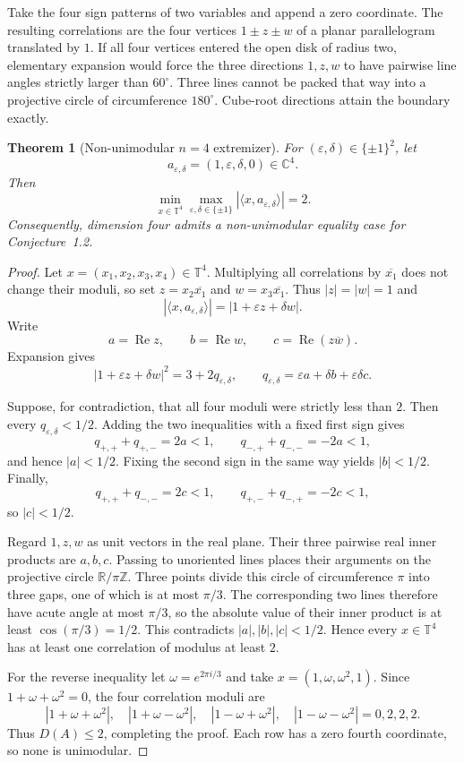 \documentclass[11pt]{article}
\newtheorem{theorem}{Theorem}
\newcommand{\T}{\mathbb T}
\begin{document}
Take the four sign patterns of two variables and append a zero coordinate.
The resulting correlations are the four vertices $1\pm z\pm w$ of a planar
parallelogram translated by $1$.  If all four vertices entered the open disk of
radius two, elementary expansion would force the three directions
$1,z,w$ to have pairwise line angles strictly larger than $60^\circ$.  Three
lines cannot be packed that way into a projective circle of circumference
$180^\circ$.  Cube-root directions attain the boundary exactly.

\begin{theorem}[Non-unimodular $n=4$ extremizer]
For $(\varepsilon,\delta)\in\{\pm1\}^2$, let
\[
 a_{\varepsilon,\delta}=(1,\varepsilon,\delta,0)\in\mathbb C^4.
\]
Then
\[
 \min_{x\in\T^4}\max_{\varepsilon,\delta\in\{\pm1\}}
 |\langle x,a_{\varepsilon,\delta}\rangle|=2.
\]
Consequently, dimension four admits a non-unimodular equality case for
Conjecture~1.2.
\end{theorem}

\begin{proof}
Let $x=(x_1,x_2,x_3,x_4)\in\T^4$.  Multiplying all correlations by
$\overline{x_1}$ does not change their moduli, so set
$z=x_2\overline{x_1}$ and $w=x_3\overline{x_1}$.  Thus $|z|=|w|=1$ and
\[
 |\langle x,a_{\varepsilon,\delta}\rangle|
   =|1+\varepsilon z+\delta w|.
\]
Write
\[
 a=\operatorname{Re}z,\qquad b=\operatorname{Re}w,\qquad
 c=\operatorname{Re}(z\overline w).
\]
Expansion gives
\begin{equation}\label{eq:expand}
 |1+\varepsilon z+\delta w|^2
 =3+2q_{\varepsilon,\delta},\qquad
 q_{\varepsilon,\delta}=\varepsilon a+\delta b+\varepsilon\delta c.
\end{equation}

Suppose, for contradiction, that all four moduli were strictly less than $2$.
Then every $q_{\varepsilon,\delta}<1/2$.  Adding the two inequalities with a
fixed first sign gives
\[
 q_{+, +}+q_{+,-}=2a<1,
 \qquad q_{-,+}+q_{-,-}=-2a<1,
\]
and hence $|a|<1/2$.  Fixing the second sign in the same way yields
$|b|<1/2$.  Finally,
\[
 q_{+,+}+q_{-,-}=2c<1,
 \qquad q_{+,-}+q_{-,+}=-2c<1,
\]
so $|c|<1/2$.

Regard $1,z,w$ as unit vectors in the real plane.  Their three pairwise real
inner products are $a,b,c$.  Passing to unoriented lines places their arguments
on the projective circle $\mathbb R/\pi\mathbb Z$.  Three points divide this
circle of circumference $\pi$ into three gaps, one of which is at most
$\pi/3$.  The corresponding two lines therefore have acute angle at most
$\pi/3$, so the absolute value of their inner product is at least
$\cos(\pi/3)=1/2$.  This contradicts $|a|,|b|,|c|<1/2$.  Hence every
$x\in\T^4$ has at least one correlation of modulus at least $2$.

For the reverse inequality let $\omega=e^{2\pi i/3}$ and take
$x=(1,\omega,\omega^2,1)$.  Since $1+\omega+\omega^2=0$, the four correlation
moduli are
\[
 |1+\omega+\omega^2|,\quad |1+\omega-\omega^2|,\quad
 |1-\omega+\omega^2|,\quad |1-\omega-\omega^2|
   =0,2,2,2.
\]
Thus $D(A)\leq2$, completing the proof.  Each row has a zero fourth coordinate,
so none is unimodular.
\end{proof}
\end{document}
